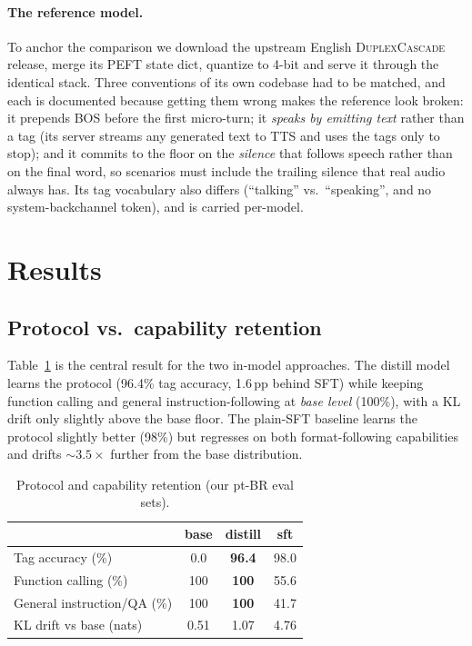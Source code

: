 \documentclass[conference]{IEEEtran}
\begin{document}
\paragraph{The reference model.} To anchor the comparison we download the upstream
English \textsc{DuplexCascade} release, merge its PEFT state dict, quantize to
4-bit and serve it through the identical stack. Three conventions of its own
codebase had to be matched, and each is documented because getting them wrong
makes the reference look broken: it prepends BOS before the first micro-turn; it
\emph{speaks by emitting text} rather than a tag (its server streams any generated
text to TTS and uses the tags only to stop); and it commits to the floor on the
\emph{silence} that follows speech rather than on the final word, so scenarios
must include the trailing silence that real audio always has. Its tag vocabulary
also differs (``talking'' vs.\ ``speaking'', and no system-backchannel token), and
is carried per-model.

\section{Results}
\label{sec:results}

\subsection{Protocol vs.\ capability retention}
Table~\ref{tab:custom} is the central result for the two in-model approaches. The
distill model learns the protocol (96.4\% tag accuracy, 1.6\,pp behind SFT) while
keeping function calling and general instruction-following at \emph{base level}
(100\%), with a KL drift only slightly above the base floor. The plain-SFT
baseline learns the protocol slightly better (98\%) but regresses on both
format-following capabilities and drifts ${\sim}3.5\times$ further from the base
distribution.

\begin{table}[t]
\centering
\caption{Protocol and capability retention (our pt-BR eval sets).}
\label{tab:custom}
\begin{tabular}{lccc}
\toprule
 & base & \textbf{distill} & sft \\
\midrule
Tag accuracy (\%) & 0.0 & \textbf{96.4} & 98.0 \\
Function calling (\%) & 100 & \textbf{100} & 55.6 \\
General instruction/QA (\%) & 100 & \textbf{100} & 41.7 \\
KL drift vs base (nats) & 0.51 & 1.07 & 4.76 \\
\bottomrule
\end{tabular}
\end{table}
\end{document}
